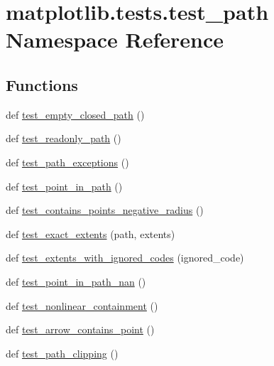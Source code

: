 \hypertarget{namespacematplotlib_1_1tests_1_1test__path}{}\section{matplotlib.\+tests.\+test\+\_\+path Namespace Reference}
\label{namespacematplotlib_1_1tests_1_1test__path}
\subsection*{Functions}
\begin{DoxyCompactItemize}
\item 
def \hyperlink{namespacematplotlib_1_1tests_1_1test__path_ab2f86cf67e95c6712833ddee40b7f032}{test\+\_\+empty\+\_\+closed\+\_\+path} ()
\item 
def \hyperlink{namespacematplotlib_1_1tests_1_1test__path_af1a7262cb0bff1092c36605d08adae4d}{test\+\_\+readonly\+\_\+path} ()
\item 
def \hyperlink{namespacematplotlib_1_1tests_1_1test__path_aec7483808d1421e672c678cd3419dcf1}{test\+\_\+path\+\_\+exceptions} ()
\item 
def \hyperlink{namespacematplotlib_1_1tests_1_1test__path_ab8dbf5b1e0c9759098456aed58efd94d}{test\+\_\+point\+\_\+in\+\_\+path} ()
\item 
def \hyperlink{namespacematplotlib_1_1tests_1_1test__path_adfc36d3f0b5aa6712ea561423d789ff7}{test\+\_\+contains\+\_\+points\+\_\+negative\+\_\+radius} ()
\item 
def \hyperlink{namespacematplotlib_1_1tests_1_1test__path_ac5762804f5200761fbc229fa087b5d4e}{test\+\_\+exact\+\_\+extents} (path, extents)
\item 
def \hyperlink{namespacematplotlib_1_1tests_1_1test__path_a79477f1d4517785ed345bef1f651a486}{test\+\_\+extents\+\_\+with\+\_\+ignored\+\_\+codes} (ignored\+\_\+code)
\item 
def \hyperlink{namespacematplotlib_1_1tests_1_1test__path_a2db2b4fb955310a0bbf346765daf2888}{test\+\_\+point\+\_\+in\+\_\+path\+\_\+nan} ()
\item 
def \hyperlink{namespacematplotlib_1_1tests_1_1test__path_ad1ee32769952ebd6597ee934caa31a19}{test\+\_\+nonlinear\+\_\+containment} ()
\item 
def \hyperlink{namespacematplotlib_1_1tests_1_1test__path_a925a10aa016a1d0fee354f8c2e6d2b46}{test\+\_\+arrow\+\_\+contains\+\_\+point} ()
\item 
def \hyperlink{namespacematplotlib_1_1tests_1_1test__path_a0f4a1fa6ec37b6e39d86a80d2eae984f}{test\+\_\+path\+\_\+clipping} ()

\end{DoxyCompactItemize}
